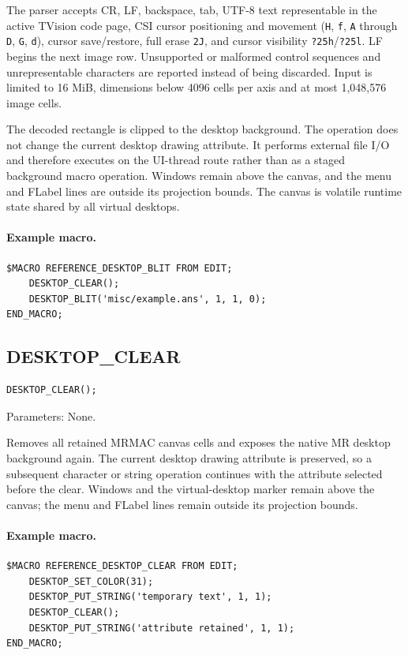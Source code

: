 \documentclass[a4paper,10pt,twoside,openany]{book}
\newenvironment{mrmacextension}{\begin{changebar}}{\end{changebar}}
\begin{document}
\begin{mrmacextension}
The parser accepts CR, LF, backspace, tab, UTF-8 text representable in the
active TVision code page, CSI cursor positioning and movement
(\texttt{H}, \texttt{f}, \texttt{A} through \texttt{D}, \texttt{G},
\texttt{d}), cursor save/restore, full erase \texttt{2J}, and cursor visibility
\texttt{?25h}/\texttt{?25l}. LF begins the next image row. Unsupported or
malformed control sequences and unrepresentable characters are reported
instead of being discarded. Input is limited to 16 MiB, dimensions below 4096
cells per axis and at most 1,048,576 image cells.

The decoded rectangle is clipped to the desktop background. The operation does
not change the current desktop drawing attribute. It performs external file I/O
and therefore executes on the UI-thread route rather than as a staged
background macro operation. Windows remain above the canvas, and the menu and
FLabel lines are outside its projection bounds. The canvas is volatile runtime
state shared by all virtual desktops.

\paragraph{Example macro.}
\begin{verbatim}
$MACRO REFERENCE_DESKTOP_BLIT FROM EDIT;
    DESKTOP_CLEAR();
    DESKTOP_BLIT('misc/example.ans', 1, 1, 0);
END_MACRO;
\end{verbatim}
\end{mrmacextension}

\begin{mrmacextension}
\label{prim:procedure-desktop-clear}
\subsection*{DESKTOP\_CLEAR}
\begin{verbatim}
DESKTOP_CLEAR();
\end{verbatim}
Parameters: None.

Removes all retained MRMAC canvas cells and exposes the native MR desktop
background again. The current desktop drawing attribute is preserved, so a
subsequent character or string operation continues with the attribute selected
before the clear. Windows and the virtual-desktop marker remain above the
canvas; the menu and FLabel lines remain outside its projection bounds.

\paragraph{Example macro.}
\begin{verbatim}
$MACRO REFERENCE_DESKTOP_CLEAR FROM EDIT;
    DESKTOP_SET_COLOR(31);
    DESKTOP_PUT_STRING('temporary text', 1, 1);
    DESKTOP_CLEAR();
    DESKTOP_PUT_STRING('attribute retained', 1, 1);
END_MACRO;
\end{verbatim}
\end{mrmacextension}
\end{document}
